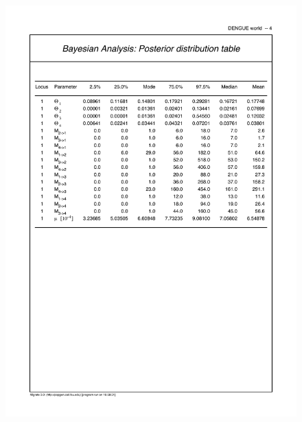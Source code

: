 \begin{figure}[htb]
\begin{center}
\includegraphics[scale=0.6]{mim/bayestable}\\

\end{center}
\end{figure}
